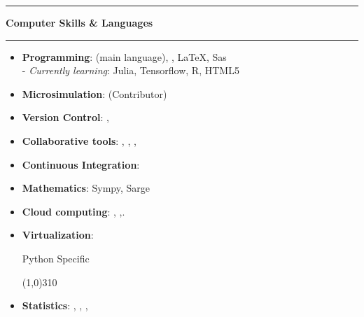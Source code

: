 \documentclass[a4paper,11pt]{article} %
\newcommand{\myhref}[3][blue]{\href{#2}{\color{#1}{#3}}}%
\newcommand{\titre}[1]{%
	\begin{center}
	\rule{\textwidth}{1pt}
	\par\vspace{0.1cm}
        \textbf{\large #1}
	\par\rule{\textwidth}{1pt}
	\end{center}
	}
\begin{document}
\titre{Computer Skills \& Languages}

\begin{itemize}
\item \textbf{Programming}:  \myhref[black-gray]{https://www.python.org}{Python}(main language), \myhref[black-gray]{https://www.gnu.org/software/bash/}{Bash}, \LaTeX, Sas \\
  \hspace*{0.1cm}- \emph{Currently learning}: Julia, Tensorflow, R, HTML5
\item \textbf{Microsimulation}:   \myhref[black-gray]{https://fr.openfisca.org}{OpenFisca} (Contributor)
\item \textbf{Version Control}:  \myhref[black-gray]{https://git-scm.com}{git}, \myhref[black-gray]{https://gitless.com}{gitless}


\item \textbf{Collaborative tools}:  \myhref[black-gray]{https://www.github.com/}{GitHub}, \myhref[black-gray]{https://www.github.com/}{Slack}, \myhref[black-gray]{https://colab.research.google.com/}{Google Colab}, \myhref[black-gray]{https://visualstudio.microsoft.com/services/live-share/}{VS Live Share}

 \item \textbf{Continuous Integration}:  \myhref[black-gray]{https://travis-ci.com/}{Travis CI}
\item \textbf{Mathematics}: Sympy, Sarge
\item \textbf{Cloud computing}: \myhref[black-gray]{https://aws.amazon.com/fr/}{AWS},  \myhref[black-gray]{https://www.scaleway.com}{Scaleway},\myhref[black-gray]{https://www.kaggle.com/docs/kernels}{Kaggle Kernels}.
\item \textbf{Virtualization}: \myhref[black-gray]{https://github.com/docker/docker-ce}{Docker}

 Python Specific
 \vspace{-0.5cm}
 \begin{flushleft}
\line(1,0){310}
\end{flushleft}
 \item \textbf{Statistics}: \myhref[black-gray]{http://pandas.pydata.org}{Pandas}, \myhref[black-gray]{http://www.statsmodels.org/stable/}{Statsmodels}, \myhref[black-gray]{https://bashtage.github.io/linearmodels/}{linearmodels}, \myhref[black-gray]{https://scikit-learn.org/stable/}{Scikit-Learn} 


\end{itemize}
\end{document}
